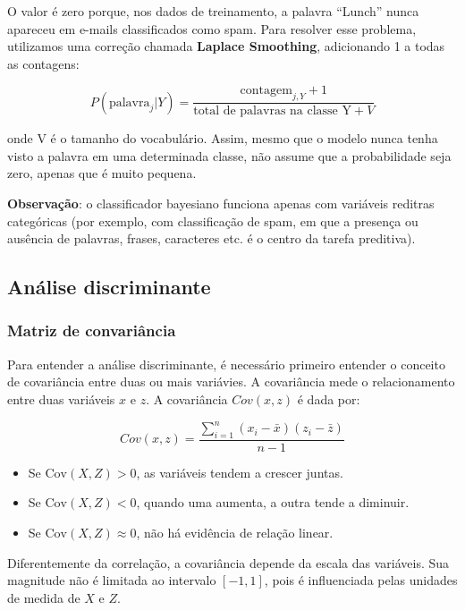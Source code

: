 \documentclass{article}
\begin{document}
O valor é zero porque, nos dados de treinamento,
a palavra ``Lunch'' nunca apareceu em e-mails classificados como spam. Para resolver
esse problema, utilizamos uma correção chamada \textbf{Laplace Smoothing}, adicionando
1 a todas as contagens:

\begin{equation*}
    P(\text{palavra}_j | Y) = \frac{\text{contagem}_{j, Y} + 1}{\text{total de palavras na classe Y} + V}
\end{equation*}

onde V é o tamanho do vocabulário. Assim, mesmo que o modelo nunca tenha visto a palavra
em uma determinada classe, não assume que a probabilidade seja zero, apenas que é muito pequena.

\textbf{Observação}: o classificador bayesiano funciona apenas com variáveis  reditras categóricas
(por exemplo, com classificação de spam, em que a presença ou ausência de palavras, frases, caracteres etc.
é o centro da tarefa preditiva). 

\subsection{Análise discriminante}

\subsubsection{Matriz de convariância}

Para entender a análise discriminante, é necessário primeiro entender o conceito de covariância entre duas
ou mais variávies. A covariância mede o relacionamento entre duas variáveis $x$ e $z$. A covariância $Cov(x, z)$
é dada por:

\begin{equation}
    Cov(x, z) = \frac{\displaystyle \sum_{i = 1}^{n}(x_i - \bar{x})(z_i - \bar{z})}{n - 1}
\end{equation}

\begin{itemize}
    \item Se $\mathrm{Cov}(X, Z) > 0$, as variáveis tendem a crescer juntas.
    \item Se $\mathrm{Cov}(X, Z) < 0$, quando uma aumenta, a outra tende a diminuir.
    \item Se $\mathrm{Cov}(X, Z) \approx 0$, não há evidência de relação linear.
\end{itemize}

Diferentemente da correlação, a covariância depende da escala das variáveis.
Sua magnitude não é limitada ao intervalo $[-1,1]$, pois é influenciada
pelas unidades de medida de $X$ e $Z$.
\end{document}
